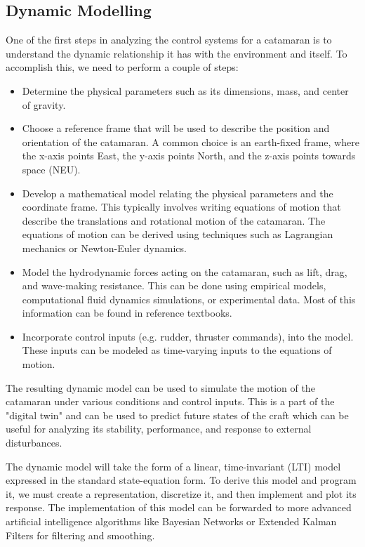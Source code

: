 \subsection[]{Dynamic Modelling}
One of the first steps in analyzing the control systems for a catamaran is to understand the dynamic relationship it has with the environment and itself.
To accomplish this, we need to perform a couple of steps:

\begin{itemize}
    \item Determine the physical parameters such as its dimensions, mass, and center of gravity. 
    \item Choose a reference frame that will be used to describe the position and orientation of the catamaran. 
    A common choice is an earth-fixed frame, where the x-axis points East, the y-axis points North, and the z-axis points towards space (NEU).
    \item Develop a mathematical model relating the physical parameters and the coordinate frame. 
    This typically involves writing equations of motion that describe the translations and rotational motion of the catamaran. 
    The equations of motion can be derived using techniques such as Lagrangian mechanics or Newton-Euler dynamics.
    \item Model the hydrodynamic forces acting on the catamaran, such as lift, drag, and wave-making resistance. 
    This can be done using empirical models, computational fluid dynamics simulations, or experimental data. 
    Most of this information can be found in reference textbooks.
    \item Incorporate control inputs (e.g. rudder, thruster commands), into the model. 
    These inputs can be modeled as time-varying inputs to the equations of motion.
\end{itemize}

The resulting dynamic model can be used to simulate the motion of the catamaran under various conditions and control inputs. 
This is a part of the "digital twin" and can be used to predict future states of the craft which can be useful for analyzing its stability, performance, and response to external disturbances. 

The dynamic model will take the form of a linear, time-invariant (LTI) model expressed in the standard state-equation form.
To derive this model and program it, we must create a representation, discretize it, and then implement and plot its response.
The implementation of this model can be forwarded to more advanced artificial intelligence algorithms like Bayesian Networks or Extended Kalman Filters for filtering and smoothing.

